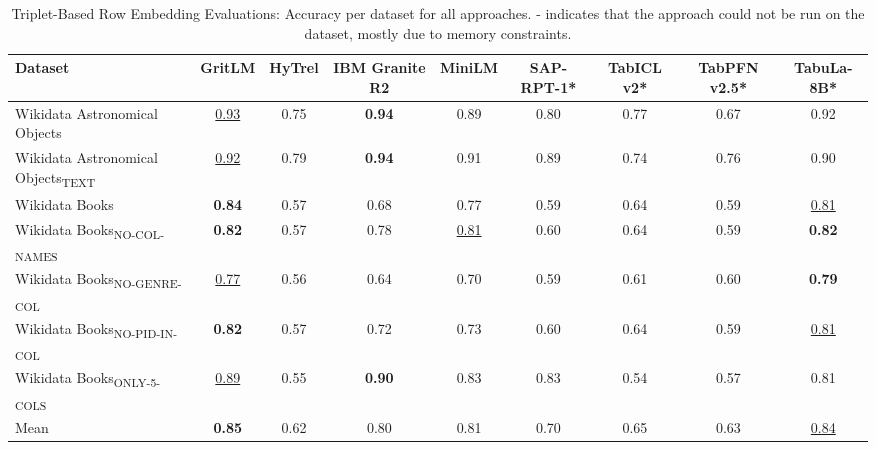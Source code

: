 \begin{table}[t]
\centering
\begin{tabular*}{\textwidth}{lcccccccc}
\hline
Dataset & GritLM & HyTrel & IBM Granite R2 & MiniLM & SAP-RPT-1* & TabICL v2* & TabPFN v2.5* & TabuLa-8B* \\
\hline
Wikidata Astronomical Objects & \underline{0.93} & 0.75 & \textbf{0.94} & 0.89 & 0.80 & 0.77 & 0.67 & 0.92 \\
Wikidata Astronomical Objects\textsubscript{TEXT} & \underline{0.92} & 0.79 & \textbf{0.94} & 0.91 & 0.89 & 0.74 & 0.76 & 0.90 \\
Wikidata Books & \textbf{0.84} & 0.57 & 0.68 & 0.77 & 0.59 & 0.64 & 0.59 & \underline{0.81} \\
Wikidata Books\textsubscript{NO-COL-NAMES} & \textbf{0.82} & 0.57 & 0.78 & \underline{0.81} & 0.60 & 0.64 & 0.59 & \textbf{0.82} \\
Wikidata Books\textsubscript{NO-GENRE-COL} & \underline{0.77} & 0.56 & 0.64 & 0.70 & 0.59 & 0.61 & 0.60 & \textbf{0.79} \\
Wikidata Books\textsubscript{NO-PID-IN-COL} & \textbf{0.82} & 0.57 & 0.72 & 0.73 & 0.60 & 0.64 & 0.59 & \underline{0.81} \\
Wikidata Books\textsubscript{ONLY-5-COLS} & \underline{0.89} & 0.55 & \textbf{0.90} & 0.83 & 0.83 & 0.54 & 0.57 & 0.81 \\
Mean & \textbf{0.85} & 0.62 & 0.80 & 0.81 & 0.70 & 0.65 & 0.63 & \underline{0.84} \\
\hline
\end{tabular*}
\caption{Triplet-Based Row Embedding Evaluations: Accuracy per dataset for all approaches. - indicates that the approach could not be run on the dataset, mostly due to memory constraints.}
\label{tab:triplet_per_dataset}
\end{table}
